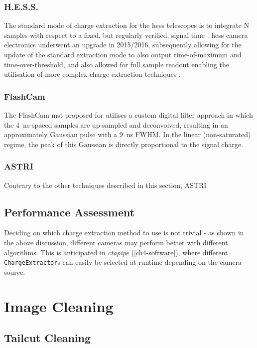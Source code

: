\subsubsection{H.E.S.S.}

The standard mode of charge extraction for the \gls{hess} telescopes is to integrate N samples with respect to a fixed, but regularly verified, signal time \cite{Aharonian2004}. \gls{hess} camera electronics underwent an upgrade in 2015/2016, subsequently allowing for the update of the standard extraction mode to also output time-of-maximum and time-over-threshold, and also allowed for full sample readout enabling the utilisation of more complex charge extraction techniques \cite{Klepser2017}\cite{Chalme-Calvet2015}.

\subsubsection{FlashCam}

The FlashCam \gls{mst} proposed for  utilises a custom digital filter approach in which the 4~ns-spaced samples are up-sampled and deconvolved, resulting in an approximately Gaussian pulse with a 9~ns FWHM. In the linear (non-saturated) regime, the peak of this Gaussian is directly proportional to the signal charge. 

\subsubsection{ASTRI}

Contrary to the other techniques described in this section, ASTRI 

\subsection{Performance Assessment}

Deciding on which charge extraction method to use is not trivial - as shown in the above discussion, different cameras may perform better with different algorithms. This is anticipated in \textit{ctapipe} (\ref{ch4-software}), where different \lstinline{ChargeExtractor}s can easily be selected at runtime depending on the camera source. 

\section{Image Cleaning}

\subsection{Tailcut Cleaning}

